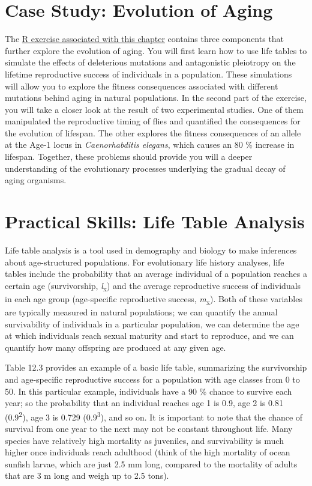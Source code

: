 \documentclass[
]{book}
\begin{document}
\hypertarget{case-study-evolution-of-aging}{%
\section{Case Study: Evolution of Aging}\label{case-study-evolution-of-aging}}

The \href{exercises/BIOL520-ex11.zip}{R exercise associated with this chapter} contains three components that further explore the evolution of aging. You will first learn how to use life tables to simulate the effects of deleterious mutations and antagonistic pleiotropy on the lifetime reproductive success of individuals in a population. These simulations will allow you to explore the fitness consequences associated with different mutations behind aging in natural populations. In the second part of the exercise, you will take a closer look at the result of two experimental studies. One of them manipulated the reproductive timing of flies and quantified the consequences for the evolution of lifespan. The other explores the fitness consequences of an allele at the Age-1 locus in \emph{Caenorhabditis elegans}, which causes an 80 \% increase in lifespan. Together, these problems should provide you will a deeper understanding of the evolutionary processes underlying the gradual decay of aging organisms.

\hypertarget{practical-skills-life-table-analysis}{%
\section{Practical Skills: Life Table Analysis}\label{practical-skills-life-table-analysis}}

Life table analysis is a tool used in demography and biology to make inferences about age-structured populations. For evolutionary life history analyses, life tables include the probability that an average individual of a population reaches a certain age (survivorship, \emph{l}\textsubscript{x}) and the average reproductive success of individuals in each age group (age-specific reproductive success, \emph{m}\textsubscript{x}). Both of these variables are typically measured in natural populations; we can quantify the annual survivability of individuals in a particular population, we can determine the age at which individuals reach sexual maturity and start to reproduce, and we can quantify how many offspring are produced at any given age.

Table 12.3 provides an example of a basic life table, summarizing the survivorship and age-specific reproductive success for a population with age classes from 0 to 50. In this particular example, individuals have a 90 \% chance to survive each year; so the probability that an individual reaches age 1 is 0.9, age 2 is 0.81 (0.9\textsuperscript{2}), age 3 is 0.729 (0.9\textsuperscript{3}), and so on. It is important to note that the chance of survival from one year to the next may not be constant throughout life. Many species have relatively high mortality as juveniles, and survivability is much higher once individuals reach adulthood (think of the high mortality of ocean sunfish larvae, which are just 2.5 mm long, compared to the mortality of adults that are 3 m long and weigh up to 2.5 tons).
\end{document}
